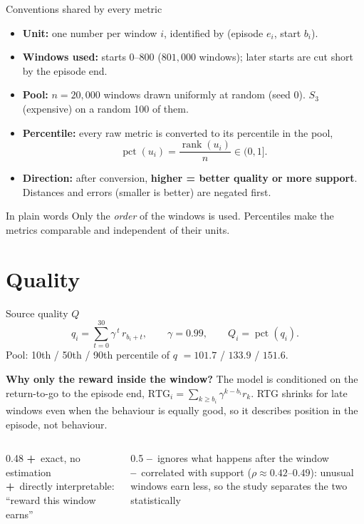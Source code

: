 \documentclass[aspectratio=169,11pt]{beamer}
\DeclareMathOperator{\pct}{pct}
\newcommand{\pro}{\textcolor{green!45!black}{\textbf{+}}\ }
\newcommand{\con}{\textcolor{red!60!black}{\textbf{--}}\ }
\begin{document}
\begin{frame}{Conventions shared by every metric}
\begin{itemize}
\item \textbf{Unit:} one number per window $i$, identified by (episode $e_i$, start $b_i$).
\item \textbf{Windows used:} starts $0$--$800$ ($801{,}000$ windows); later starts are cut short by the episode end.
\item \textbf{Pool:} $n=20{,}000$ windows drawn uniformly at random (seed 0). $S_3$ (expensive) on a random 100 of them.
\item \textbf{Percentile:} every raw metric is converted to its percentile in the pool,
\[
\pct(u_i)=\frac{\operatorname{rank}(u_i)}{n}\in(0,1].
\]
\item \textbf{Direction:} after conversion, \textbf{higher = better quality or more support}. Distances and errors (smaller is better) are negated first.
\end{itemize}
\begin{block}{In plain words}
Only the \emph{order} of the windows is used. Percentiles make the metrics comparable and independent of their units.
\end{block}
\end{frame}

\section{Quality}
\begin{frame}{Source quality $Q$}
\[
q_i=\sum_{t=0}^{30}\gamma^{\,t}\,r_{b_i+t},\qquad \gamma=0.99,\qquad Q_i=\pct(q_i).
\]
Pool: 10th / 50th / 90th percentile of $q$ $=101.7$ / $133.9$ / $151.6$.
\vspace{0.5em}

\textbf{Why only the reward inside the window?} The model is conditioned on the return-to-go to the episode end, $\mathrm{RTG}_i=\sum_{k\ge b_i}\gamma^{k-b_i}r_k$. RTG shrinks for late windows even when the behaviour is equally good, so it describes position in the episode, not behaviour.
\vspace{0.5em}

\begin{columns}[T]
\begin{column}{0.48\linewidth}
\pro exact, no estimation\\
\pro directly interpretable: ``reward this window earns''
\end{column}
\begin{column}{0.5\linewidth}
\con ignores what happens after the window\\
\con correlated with support ($\rho\approx0.42$--$0.49$): unusual windows earn less, so the study separates the two statistically
\end{column}
\end{columns}
\end{frame}
\end{document}
